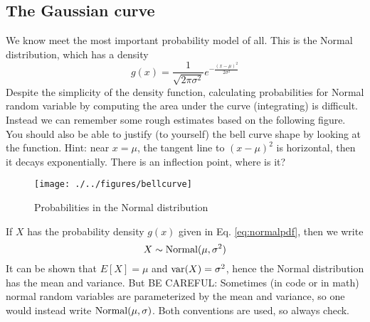   \subsection{The Gaussian curve}
We know meet the most important probability model of all. This is the Normal distribution, which has a density 
   \begin{equation}\label{eq:normalpdf}
   g(x)= \frac{1}{\sqrt{2\pi \sigma^2}}e^{-\frac{(x-\mu)^2}{2 \sigma^2}}
   \end{equation}
 Despite the simplicity of the density function, calculating probabilities for Normal random variable by computing the area under the curve (integrating) is difficult. Instead we can remember some rough estimates based on the following figure. You should also be able to justify (to yourself) the bell curve shape by looking at the function. Hint: near $x = \mu$, the tangent line to $(x-\mu)^2$ is horizontal, then it decays exponentially. There is an inflection point, where is it? 

\begin{figure}[h]
\centering
\texttt{[image: ./../figures/bellcurve]}
\caption{Probabilities in the Normal distribution}\label{fig:bellcurve}
\end{figure}

If $X$ has the probability density $g(x)$ given in Eq. \ref{eq:normalpdf}, then we write
\begin{equation}
X \sim {\rm Normal}(\mu, \sigma^2)
\end{equation}
It can be shown that $E[X] = \mu$ and ${\rm var}(X) = \sigma^2$, hence the Normal distribution has the mean and variance. But BE CAREFUL: Sometimes (in code or in math) normal random variables are parameterized by the mean and variance, so one would instead write ${\rm Normal}(\mu, \sigma)$. Both conventions are used, so always check. 





